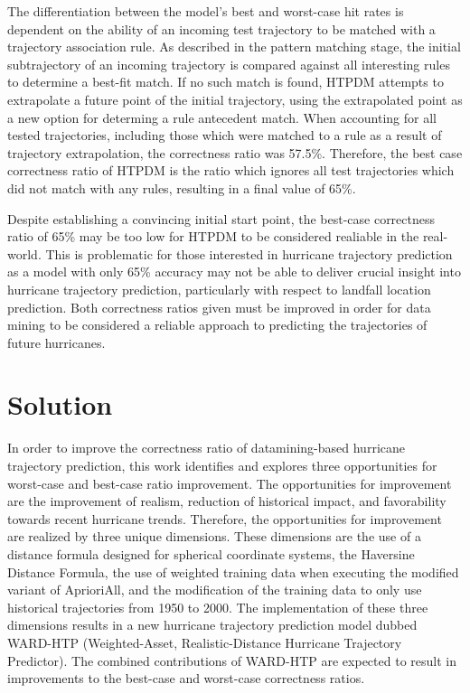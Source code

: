 \documentclass[12pt,conference]{IEEEtran}
\begin{document}
The differentiation between the model's best and worst-case hit rates is dependent on the ability of an incoming test trajectory to be matched with a trajectory association rule. As described in the pattern matching stage, the initial subtrajectory of an incoming trajectory is compared against all interesting rules to determine a best-fit match. If no such match is found, HTPDM attempts to extrapolate a future point of the initial trajectory, using the extrapolated point as a new option for determing a rule antecedent match. When accounting for all tested trajectories, including those which were matched to a rule as a result of trajectory extrapolation, the correctness ratio was 57.5\%. Therefore, the best case correctness ratio of HTPDM is the ratio which ignores all test trajectories which did not match with any rules, resulting in a final value of 65\%.

Despite establishing a convincing initial start point, the best-case correctness ratio of 65\% may be too low for HTPDM to be considered realiable in the real-world. This is problematic for those interested in hurricane trajectory prediction as a model with only 65\% accuracy may not be able to deliver crucial insight into hurricane trajectory prediction, particularly with respect to landfall location prediction. Both correctness ratios given must be improved in order for data mining to be considered a reliable approach to predicting the trajectories of future hurricanes.

\section{Solution}

In order to improve the correctness ratio of datamining-based hurricane trajectory prediction, this work identifies and explores three opportunities for worst-case and best-case ratio improvement. The opportunities for improvement are the improvement of realism, reduction of historical impact, and favorability towards recent hurricane trends. Therefore, the opportunities for improvement are realized by three unique dimensions. These dimensions are the use of a distance formula designed for spherical coordinate systems, the Haversine Distance Formula, the use of weighted training data when executing the modified variant of AprioriAll, and the modification of the training data to only use historical trajectories from 1950 to 2000. The implementation of these three dimensions results in a new hurricane trajectory prediction model dubbed WARD-HTP (Weighted-Asset, Realistic-Distance Hurricane Trajectory Predictor). The combined contributions of WARD-HTP are expected to result in improvements to the best-case and worst-case correctness ratios.
\end{document}
